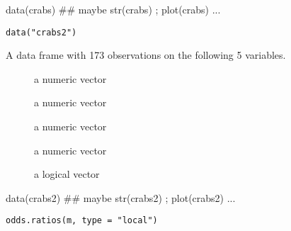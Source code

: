 \documentclass[letterpaper]{book}
\begin{document}
%
\begin{Examples}
\begin{ExampleCode}
data(crabs)
## maybe str(crabs) ; plot(crabs) ...
\end{ExampleCode}
\end{Examples}
%
\begin{Usage}
\begin{verbatim}
data("crabs2")
\end{verbatim}
\end{Usage}
%
\begin{Format}
A data frame with 173 observations on the following 5 variables.
\begin{description}

\item[] a numeric vector
\item[] a numeric vector
\item[] a numeric vector
\item[] a numeric vector
\item[] a logical vector

\end{description}

\end{Format}
%
\begin{Examples}
\begin{ExampleCode}
data(crabs2)
## maybe str(crabs2) ; plot(crabs2) ...
\end{ExampleCode}
\end{Examples}
%
\begin{Usage}
\begin{verbatim}
odds.ratios(m, type = "local")
\end{verbatim}
\end{Usage}
%
\begin{Arguments}
\begin{ldescription}
\item[\code{m}] 


\item[\code{type}] 


\end{ldescription}
\end{Arguments}
\end{document}
